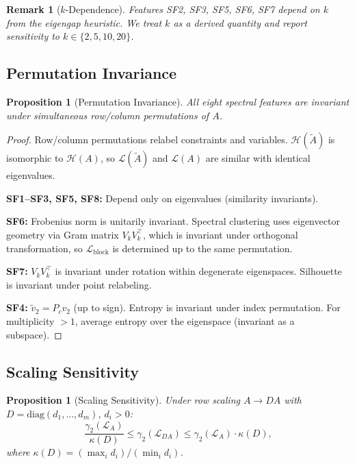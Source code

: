 \documentclass[12pt]{article}
\newtheorem{proposition}[theorem]{Proposition}
\newtheorem{remark}[theorem]{Remark}
\begin{document}
\begin{remark}[$k$-Dependence]
\label{rem:k-dependence}
Features SF2, SF3, SF5, SF6, SF7 depend on $k$ from the eigengap heuristic.
We treat $k$ as a derived quantity and report sensitivity to
$k \in \{2, 5, 10, 20\}$.
\end{remark}

\subsection{Permutation Invariance}

\begin{proposition}[Permutation Invariance]
\label{prop:F1}
All eight spectral features are invariant under simultaneous row/column
permutations of $A$.
\end{proposition}

\begin{proof}
Row/column permutations relabel constraints and variables.
$\mathcal{H}(\tilde{A})$ is isomorphic to $\mathcal{H}(A)$, so
$\mathcal{L}(\tilde{A})$ and $\mathcal{L}(A)$ are similar with identical eigenvalues.

\textbf{SF1--SF3, SF5, SF8:} Depend only on eigenvalues (similarity invariants).

\textbf{SF6:} Frobenius norm is unitarily invariant. Spectral clustering
uses eigenvector geometry via Gram matrix $V_k V_k^\top$, which is invariant
under orthogonal transformation, so $\mathcal{L}_{\mathrm{block}}$ is determined
up to the same permutation.

\textbf{SF7:} $V_k V_k^\top$ is invariant under rotation within degenerate
eigenspaces. Silhouette is invariant under point relabeling.

\textbf{SF4:} $\tilde{v}_2 = P_c v_2$ (up to sign). Entropy is invariant
under index permutation. For multiplicity $> 1$, average entropy over the
eigenspace (invariant as a subspace).
\end{proof}

\subsection{Scaling Sensitivity}

\begin{proposition}[Scaling Sensitivity]
\label{prop:F2}
Under row scaling $A \to DA$ with $D = \mathrm{diag}(d_1, \ldots, d_m)$, $d_i > 0$:
\begin{equation}\label{eq:F2}
  \frac{\gamma_2(\mathcal{L}_A)}{\kappa(D)}
  \leq \gamma_2(\mathcal{L}_{DA})
  \leq \gamma_2(\mathcal{L}_A) \cdot \kappa(D),
\end{equation}
where $\kappa(D) = (\max_i d_i)/(\min_i d_i)$.
\end{proposition}
\end{document}

